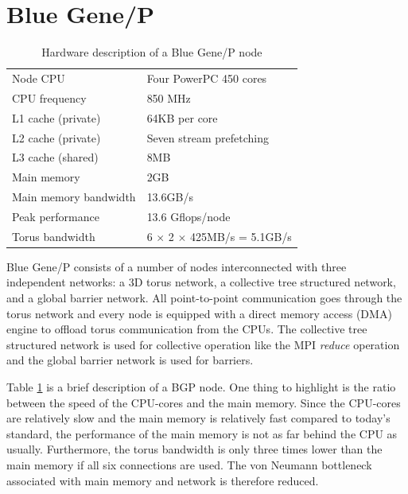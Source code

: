 \documentclass[conference]{IEEEtran}
\begin{document}
\section{Blue Gene/P}
%
\begin{table}
\caption{Hardware description of a Blue Gene/P node}
\label{tab:bgp}
\centering
\begin{tabular}{l l}
\hline
Node CPU & Four PowerPC 450 cores\\
CPU frequency & 850 MHz\\
L1 cache (private) & 64KB per core\\
L2 cache (private) & Seven stream pre\-fetching\\
L3 cache (shared) & 8MB\\
Main memory & 2GB\\
Main memory bandwidth & 13.6GB/s\\
Peak performance & 13.6 Gflops/node\\
Torus bandwidth & 6 $\times$ 2 $\times$ 425MB/s = 5.1GB/s\\
\hline
\end{tabular}
\end{table}

Blue Gene/P consists of a number of nodes interconnected with three independent networks: a 3D torus network, a collective tree structured network, and a global barrier network. All point-to-point communication goes through the torus network and every node is equipped with a direct memory access (DMA) engine to offload torus communication from the CPUs. The collective tree structured network is used for collective operation like the MPI \emph{reduce} operation and the global barrier network is used for barriers.

Table \ref{tab:bgp} is a brief description of a BGP node. One thing to highlight is the ratio between the speed of the CPU-cores and the main memory. 
Since the CPU-cores are relatively slow and the main memory is relatively fast compared to today's standard, the performance of the main memory is not as far behind the CPU as usually. Furthermore, the torus bandwidth is only three times lower than the main memory if all six connections are used. The von Neumann bottleneck associated with main memory and network is therefore reduced.
\end{document}
